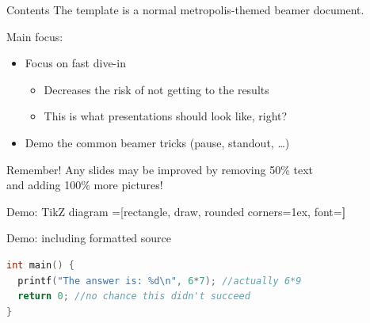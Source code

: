 \documentclass[aspectratio=169]{beamer}
\begin{document}
\begin{frame}{Contents}
The template is a normal metropolis-themed beamer document.

Main focus:
\begin{itemize}
\item Focus on fast dive-in \pause
  \begin{itemize}
  \item Decreases the risk of not getting to the results
  \item This is what presentations should look like, right? \pause
  \end{itemize}
\item Demo the common beamer tricks (pause, standout, \dots)
\end{itemize}
\end{frame}

\begin{frame}[standout]{Remember!}
Any slides may be improved by removing 50\% text \\ and adding 100\% more pictures!
\end{frame}

\begin{frame}{Demo: TikZ diagram}
\centering
{}=[rectangle, draw, rounded corners=1ex, font=\huge\bfseries]
\end{frame}

\begin{frame}[fragile]{Demo: including formatted source}

\begin{lstlisting}[language=C,showstringspaces=false,basicstyle=\tt\small,commentstyle=\color{green!50!black},keywordstyle=\bfseries\color{blue!50!black},stringstyle=\color{red!50!black}]
int main() {
  printf("The answer is: %d\n", 6*7); //actually 6*9
  return 0; //no chance this didn't succeed
}
\end{lstlisting}
\end{frame}
\end{document}
